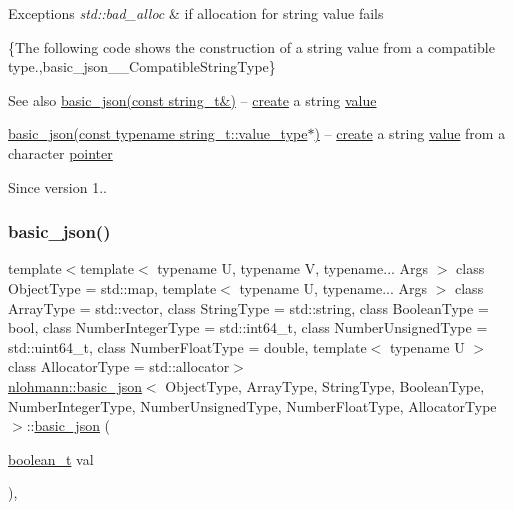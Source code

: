 \begin{DoxyExceptions}{Exceptions}
{\em std\+::bad\+\_\+alloc} & if allocation for string value fails\\
\hline
\end{DoxyExceptions}
\{The following code shows the construction of a string value from a compatible type.,basic\+\_\+json\+\_\+\+\_\+\+Compatible\+String\+Type\}

\begin{DoxySeeAlso}{See also}
\hyperlink{classnlohmann_1_1basic__json_ab8b43d92a042dde96c28aeea81dd52de}{basic\+\_\+json(const string\+\_\+t\&)} -- \hyperlink{classnlohmann_1_1basic__json_afdb7a485369fbfd8c4c7c134ebb1feb5}{create} a string \hyperlink{classnlohmann_1_1basic__json_a407e73a037e6e3067ef7aa2c25a79f39}{value} 

\hyperlink{classnlohmann_1_1basic__json_a3654da9a84deaf61899c4eee5b93c2c5}{basic\+\_\+json(const typename string\+\_\+t\+::value\+\_\+type$\ast$)} -- \hyperlink{classnlohmann_1_1basic__json_afdb7a485369fbfd8c4c7c134ebb1feb5}{create} a string \hyperlink{classnlohmann_1_1basic__json_a407e73a037e6e3067ef7aa2c25a79f39}{value} from a character \hyperlink{classnlohmann_1_1basic__json_a9d1b58099dc64695fcf2847ab0b2a7c7}{pointer}
\end{DoxySeeAlso}
\begin{DoxySince}{Since}
version 1.. 
\end{DoxySince}
\hypertarget{classnlohmann_1_1basic__json_aac36af84d907b5c3e469af889661620a}{}\label{classnlohmann_1_1basic__json_aac36af84d907b5c3e469af889661620a} 
\subsubsection{\texorpdfstring{basic\+\_\+json()}{basic\_json()}\hspace{0.1cm}{\footnotesize\ttfamily [10/23]}}
{\footnotesize\ttfamily template$<$template$<$ typename U, typename V, typename... Args $>$ class Object\+Type = std\+::map, template$<$ typename U, typename... Args $>$ class Array\+Type = std\+::vector, class String\+Type  = std\+::string, class Boolean\+Type  = bool, class Number\+Integer\+Type  = std\+::int64\+\_\+t, class Number\+Unsigned\+Type  = std\+::uint64\+\_\+t, class Number\+Float\+Type  = double, template$<$ typename U $>$ class Allocator\+Type = std\+::allocator$>$ \\
\hyperlink{classnlohmann_1_1basic__json}{nlohmann\+::basic\+\_\+json}$<$ Object\+Type, Array\+Type, String\+Type, Boolean\+Type, Number\+Integer\+Type, Number\+Unsigned\+Type, Number\+Float\+Type, Allocator\+Type $>$\+::\hyperlink{classnlohmann_1_1basic__json}{basic\+\_\+json} (\begin{DoxyParamCaption}\item[{\hyperlink{classnlohmann_1_1basic__json_af3bc3e83aa162d7ba4df16a949872723}{boolean\+\_\+t}}]{val }\end{DoxyParamCaption})\hspace{0.3cm}{\ttfamily [inline]}, {\ttfamily [noexcept]}}



